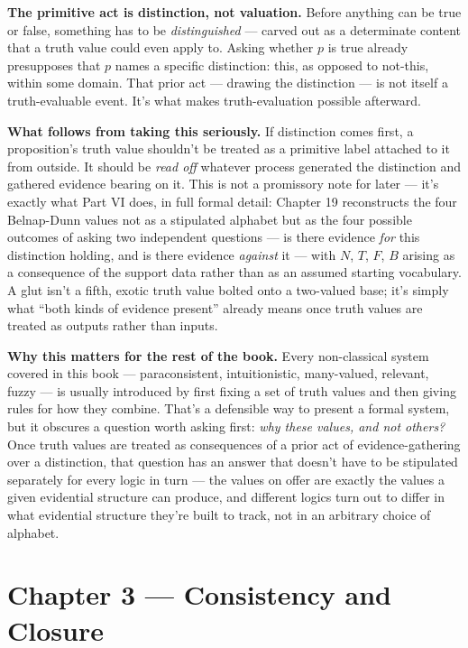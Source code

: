 \textbf{The primitive act is distinction, not valuation.} Before anything can
be true or false, something has to be \emph{distinguished} --- carved out as a
determinate content that a truth value could even apply to. Asking
whether \(p\) is true already presupposes that \(p\) names a specific
distinction: this, as opposed to not-this, within some domain. That
prior act --- drawing the distinction --- is not itself a truth-evaluable
event. It's what makes truth-evaluation possible afterward.

\textbf{What follows from taking this seriously.} If distinction comes first,
a proposition's truth value shouldn't be treated as a primitive label
attached to it from outside. It should be \emph{read off} whatever process
generated the distinction and gathered evidence bearing on it. This is
not a promissory note for later --- it's exactly what Part VI does, in full
formal detail: Chapter 19 reconstructs the four Belnap-Dunn values not as
a stipulated alphabet but as the four possible outcomes of asking two
independent questions --- is there evidence \emph{for} this distinction holding,
and is there evidence \emph{against} it --- with \(N\), \(T\), \(F\), \(B\) arising as a
consequence of the support data rather than as an assumed starting
vocabulary. A glut isn't a fifth, exotic truth value bolted onto a
two-valued base; it's simply what ``both kinds of evidence present''
already means once truth values are treated as outputs rather than
inputs.

\textbf{Why this matters for the rest of the book.} Every non-classical system
covered in this book --- paraconsistent, intuitionistic, many-valued,
relevant, fuzzy --- is usually introduced by first fixing a set of truth
values and then giving rules for how they combine. That's a defensible
way to present a formal system, but it obscures a question worth asking
first: \emph{why these values, and not others?} Once truth values are treated
as consequences of a prior act of evidence-gathering over a distinction,
that question has an answer that doesn't have to be stipulated separately
for every logic in turn --- the values on offer are exactly the values a
given evidential structure can produce, and different logics turn out to
differ in what evidential structure they're built to track, not in an
arbitrary choice of alphabet.

\hypertarget{chapter-3-consistency-and-closure}{%
\chapter*{Chapter 3 --- Consistency and Closure}
\label{chapter-3-consistency-and-closure}}


